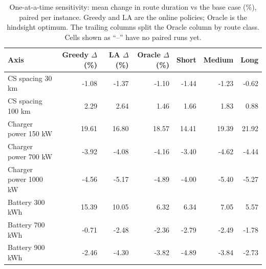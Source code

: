 \begin{table}[ht]\centering
\caption{One-at-a-time sensitivity: mean change in route duration vs the base case (\%), paired per instance.  Greedy and LA are the online policies; Oracle is the hindsight optimum.  The trailing columns split the Oracle column by route class.  Cells shown as ``--'' have no paired runs yet.}
\label{tab:sensitivity}
\begin{tabular}{lrrrrrr}
\hline
Axis & Greedy $\Delta$ (\%) & LA $\Delta$ (\%) & Oracle $\Delta$ (\%) & Short & Medium & Long \\
\hline
CS spacing 30 km & -1.08 & -1.37 & -1.10 & -1.44 & -1.23 & -0.62 \\
CS spacing 100 km & 2.29 & 2.64 & 1.46 & 1.66 & 1.83 & 0.88 \\
Charger power 150 kW & 19.61 & 16.80 & 18.57 & 14.41 & 19.39 & 21.92 \\
Charger power 700 kW & -3.92 & -4.08 & -4.16 & -3.40 & -4.62 & -4.44 \\
Charger power 1000 kW & -4.56 & -5.17 & -4.89 & -4.00 & -5.40 & -5.27 \\
Battery 300 kWh & 15.39 & 10.05 & 6.32 & 6.34 & 7.05 & 5.57 \\
Battery 700 kWh & -0.71 & -2.48 & -2.36 & -2.79 & -2.49 & -1.78 \\
Battery 900 kWh & -2.46 & -4.30 & -3.82 & -4.89 & -3.84 & -2.73 \\
\hline
\end{tabular}
\end{table}

